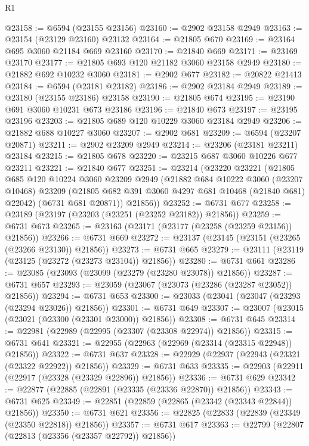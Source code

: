 \begin{lexlean}{R1}
\begin{coremodule}
@23158 := @6594 (@23155 @23156)
@23160 := @2902 @23158 @2949
@23163 := @23154 (@23129 @23160) @23132
@23164 := @21805 @670
@23169 := @23164 @695 @3060 @21184 @669 @23160
@23170 := @21840 @669
@23171 := @23169 @23170
@23177 := @21805 @693 @120 @21182 @3060 @23158 @2949
@23180 := @21882 @692 @10232 @3060
@23181 := @2902 @677
@23182 := @20822 @21413
@23184 := @6594 (@23181 @23182)
@23186 := @2902 @23184 @2949
@23189 := @23180 (@23155 @23186) @23158
@23190 := @21805 @674
@23195 := @23190 @691 @3060 @10231 @673 @23186
@23196 := @21840 @673
@23197 := @23195 @23196
@23203 := @21805 @689 @120 @10229 @3060 @23184 @2949
@23206 := @21882 @688 @10227 @3060
@23207 := @2902 @681
@23209 := @6594 (@23207 @20871)
@23211 := @2902 @23209 @2949
@23214 := @23206 (@23181 @23211) @23184
@23215 := @21805 @678
@23220 := @23215 @687 @3060 @10226 @677 @23211
@23221 := @21840 @677
@23251 := @23214
    (@23220
      @23221
      (@21805
        @685
        @120
        @10224
        @3060
        @23209
        @2949
        (@21882
          @684
          @10222
          @3060
          (@23207 @10468)
          @23209
          (@21805 @682 @391 @3060 @4297 @681 @10468 (@21840 @681) @22042)
          (@6731 @681 @20871))
        @21856))
@23252 := @6731 @677
@23258 := @23189 (@23197 (@23203 (@23251 (@23252 @23182)) @21856))
@23259 := @6731 @673
@23265 := @23163 (@23171 (@23177 (@23258 (@23259 @23156)) @21856))
@23266 := @6731 @669
@23272 := @23137 (@23145 (@23151 (@23265 (@23266 @23130)) @21856))
@23273 := @6731 @665
@23279 := @23111 (@23119 (@23125 (@23272 (@23273 @23104)) @21856))
@23280 := @6731 @661
@23286 := @23085 (@23093 (@23099 (@23279 (@23280 @23078)) @21856))
@23287 := @6731 @657
@23293 := @23059 (@23067 (@23073 (@23286 (@23287 @23052)) @21856))
@23294 := @6731 @653
@23300 := @23033 (@23041 (@23047 (@23293 (@23294 @23026)) @21856))
@23301 := @6731 @649
@23307 := @23007 (@23015 (@23021 (@23300 (@23301 @23000)) @21856))
@23308 := @6731 @645
@23314 := @22981 (@22989 (@22995 (@23307 (@23308 @22974)) @21856))
@23315 := @6731 @641
@23321 := @22955 (@22963 (@22969 (@23314 (@23315 @22948)) @21856))
@23322 := @6731 @637
@23328 := @22929 (@22937 (@22943 (@23321 (@23322 @22922)) @21856))
@23329 := @6731 @633
@23335 := @22903 (@22911 (@22917 (@23328 (@23329 @22896)) @21856))
@23336 := @6731 @629
@23342 := @22877 (@22885 (@22891 (@23335 (@23336 @22870)) @21856))
@23343 := @6731 @625
@23349 := @22851 (@22859 (@22865 (@23342 (@23343 @22844)) @21856))
@23350 := @6731 @621
@23356 := @22825 (@22833 (@22839 (@23349 (@23350 @22818)) @21856))
@23357 := @6731 @617
@23363 := @22799 (@22807 (@22813 (@23356 (@23357 @22792)) @21856))

\end{coremodule}
\end{lexlean}
